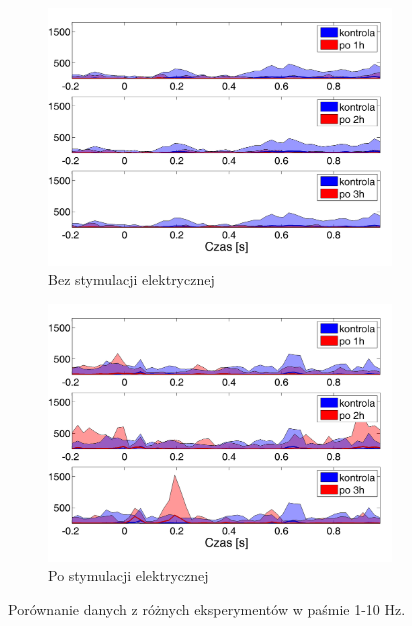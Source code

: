 \documentclass{pracamgr_2}
\begin{document}
\begin{figure}[h]
	\begin{subfigure}{.5\textwidth}
		\centering
		\includegraphics[width=1.\linewidth]{kontrola15_1-10_z_CxC8_do_LGN8.png}
		\caption{Bez stymulacji elektrycznej}
		\label{rys:1_10_kon_CxC_LGN}
	\end{subfigure}%
	\begin{subfigure}{.5\textwidth}
		\centering
		\includegraphics[width=1.\linewidth]{beta3_1-10_z_CxC5_do_LGN4.png}
		\caption{Po stymulacji elektrycznej}
		\label{rys:1_10_beta_CxC_LGN}
	\end{subfigure}
	\caption{Porównanie danych z różnych eksperymentów w paśmie 1-10 Hz.}
	\label{rys:1_10_CxC_LGN}
\end{figure}
\end{document}
